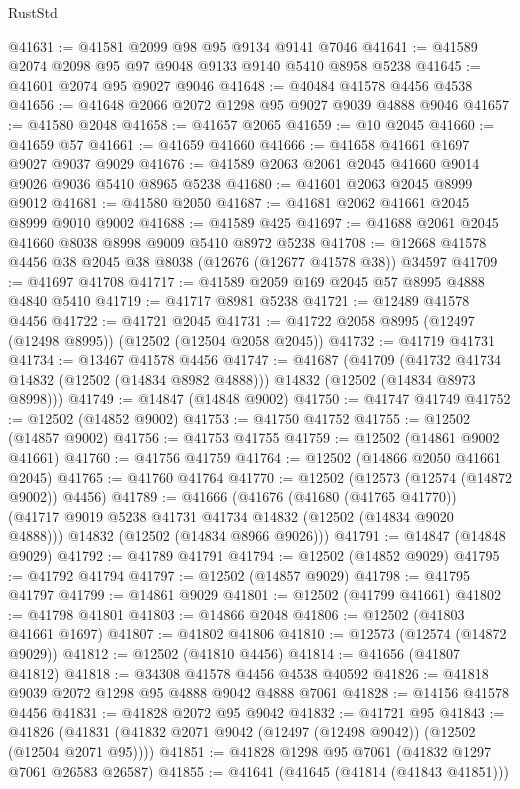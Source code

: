 \begin{lexlean}{RustStd}
\begin{coremodule}
@41631 := @41581 @2099 @98 @95 @9134 @9141 @7046
@41641 := @41589 @2074 @2098 @95 @97 @9048 @9133 @9140 @5410 @8958 @5238
@41645 := @41601 @2074 @95 @9027 @9046
@41648 := @40484 @41578 @4456 @4538
@41656 := @41648 @2066 @2072 @1298 @95 @9027 @9039 @4888 @9046
@41657 := @41580 @2048
@41658 := @41657 @2065
@41659 := @10 @2045
@41660 := @41659 @57
@41661 := @41659 @41660
@41666 := @41658 @41661 @1697 @9027 @9037 @9029
@41676 := @41589 @2063 @2061 @2045 @41660 @9014 @9026 @9036 @5410 @8965 @5238
@41680 := @41601 @2063 @2045 @8999 @9012
@41681 := @41580 @2050
@41687 := @41681 @2062 @41661 @2045 @8999 @9010 @9002
@41688 := @41589 @425
@41697 := @41688 @2061 @2045 @41660 @8038 @8998 @9009 @5410 @8972 @5238
@41708 := @12668 @41578 @4456 @38 @2045 @38 @8038 (@12676 (@12677 @41578 @38)) @34597
@41709 := @41697 @41708
@41717 := @41589 @2059 @169 @2045 @57 @8995 @4888 @4840 @5410
@41719 := @41717 @8981 @5238
@41721 := @12489 @41578 @4456
@41722 := @41721 @2045
@41731 := @41722 @2058 @8995 (@12497 (@12498 @8995)) (@12502 (@12504 @2058 @2045))
@41732 := @41719 @41731
@41734 := @13467 @41578 @4456
@41747 := @41687
    (@41709
      (@41732 @41734 @14832 (@12502 (@14834 @8982 @4888)))
      @14832
      (@12502 (@14834 @8973 @8998)))
@41749 := @14847 (@14848 @9002)
@41750 := @41747 @41749
@41752 := @12502 (@14852 @9002)
@41753 := @41750 @41752
@41755 := @12502 (@14857 @9002)
@41756 := @41753 @41755
@41759 := @12502 (@14861 @9002 @41661)
@41760 := @41756 @41759
@41764 := @12502 (@14866 @2050 @41661 @2045)
@41765 := @41760 @41764
@41770 := @12502 (@12573 (@12574 (@14872 @9002)) @4456)
@41789 := @41666
    (@41676
      (@41680 (@41765 @41770))
      (@41717 @9019 @5238 @41731 @41734 @14832 (@12502 (@14834 @9020 @4888)))
      @14832
      (@12502 (@14834 @8966 @9026)))
@41791 := @14847 (@14848 @9029)
@41792 := @41789 @41791
@41794 := @12502 (@14852 @9029)
@41795 := @41792 @41794
@41797 := @12502 (@14857 @9029)
@41798 := @41795 @41797
@41799 := @14861 @9029
@41801 := @12502 (@41799 @41661)
@41802 := @41798 @41801
@41803 := @14866 @2048
@41806 := @12502 (@41803 @41661 @1697)
@41807 := @41802 @41806
@41810 := @12573 (@12574 (@14872 @9029))
@41812 := @12502 (@41810 @4456)
@41814 := @41656 (@41807 @41812)
@41818 := @34308 @41578 @4456 @4538 @40592
@41826 := @41818 @9039 @2072 @1298 @95 @4888 @9042 @4888 @7061
@41828 := @14156 @41578 @4456
@41831 := @41828 @2072 @95 @9042
@41832 := @41721 @95
@41843 := @41826 (@41831 (@41832 @2071 @9042 (@12497 (@12498 @9042)) (@12502 (@12504 @2071 @95))))
@41851 := @41828 @1298 @95 @7061 (@41832 @1297 @7061 @26583 @26587)
@41855 := @41641 (@41645 (@41814 (@41843 @41851)))

\end{coremodule}
\end{lexlean}

